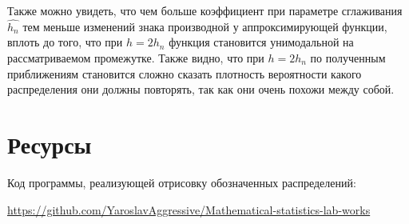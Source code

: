 \documentclass[a4paper]{article}
\begin{document}
        Также можно увидеть, что чем больше коэффициент при параметре сглаживания $\widehat{h_n}$  тем меньше изменений знака производной у аппроксимирующей функции, вплоть до того, что при $h = 2 h_n$ функция становится унимодальной на рассматриваемом промежутке. Также видно, что при $h = 2 h_n$ по полученным приближениям становится сложно сказать плотность вероятности какого распределения они должны повторять, так  как они очень похожи между собой. \\

\section{Ресурсы}
    \begin{spacing}{2.5}
        Код программы, реализующей отрисовку обозначенных распределений:
        
        \href{https://github.com/YaroslavAggressive/Mathematical-statistics-lab-works}{https://github.com/YaroslavAggressive/Mathematical-statistics-lab-works}
    \end{spacing}
\end{document}
